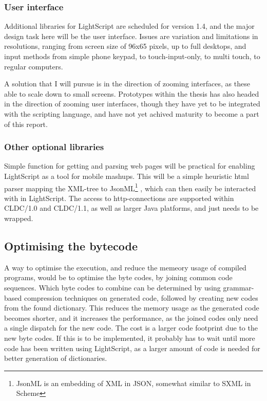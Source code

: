 \documentclass[11pt]{report}
\begin{document}
\subsubsection{User interface}
Additional libraries for LightScript are scheduled for version 1.4, and the major design task here will be the user interface. 
Issues are variation and limitations in resolutions, ranging from screen size of 96x65 pixels, up to full desktops, and input methods from simple phone keypad, to touch-input-only, to multi touch, to regular computers.

A solution that I will pursue is in the direction of zooming interfaces, as these able to scale down to small screens.
Prototypes within the thesis has also headed in the direction of zooming user interfaces, though they have yet to be integrated with the scripting language, and have not yet achived maturity to become a part of this report.

\subsubsection{Other optional libraries}

Simple function for getting and parsing web pages will be practical for enabling LightScript as a tool for mobile mashups. This will be a simple heuristic html parser mapping the XML-tree to JsonML\footnote{JsonML is an embedding of XML in JSON, somewhat similar to SXML in Scheme} \cite{jsonml}, which can then easily be interacted with in LightScript.
The access to http-connections are supported within CLDC/1.0 and CLDC/1.1, as well as larger Java platforms, and just needs to be wrapped.


\subsection{Optimising the bytecode}

A way to optimise the execution, and reduce the memeory usage of compiled programs, would be to optimise the byte codes, by joining common code sequences. Which byte codes to combine can be determined by using grammar-based compression techniques on generated code, followed by creating new codes from the found dictionary. 
This reduces the memory usage as the generated code becomes shorter, and it increases the performance, as the joined codes only need a single dispatch for the new code. The cost is a larger code footprint due to the new byte codes. If this is to be implemented, it probably has to wait until more code has been written using LightScript, as a larger amount of code is needed for better generation of dictionaries.
\end{document}
